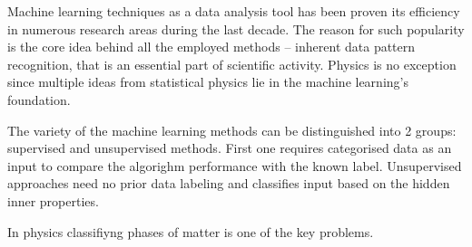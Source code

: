 \intro
\label{ch:introduction}

Machine learning techniques as a data analysis tool has been proven its efficiency in numerous research areas during the last decade.
The reason for such popularity is the core idea behind all the employed methods – inherent data pattern recognition, that is an essential part of scientific activity.
Physics is no exception since multiple ideas from statistical physics lie in the machine learning's foundation.

The variety of the machine learning methods can be distinguished into 2 groups: supervised and unsupervised methods.
First one requires categorised data as an input to compare the algorighm performance with the known label.
Unsupervised approaches need no prior data labeling and classifies input based on the hidden inner properties.

In physics classifiyng phases of matter is one of the key problems.




